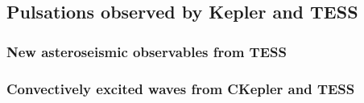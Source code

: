 {\color{blue}
\subsection{Pulsations observed by Kepler and TESS}


\subsubsection{New asteroseismic observables from TESS}

\subsubsection{Convectively excited waves from CKepler and TESS}


}